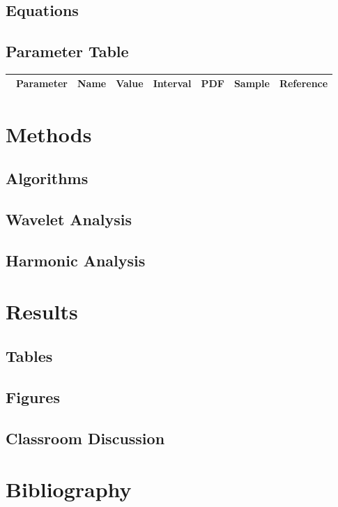 \subsection{Equations}

\subsection{Parameter Table}

\begin{table}[H]\centering
\begin{tabular}{p{1cm}p{1cm}p{1cm}p{1cm}p{1cm}p{1cm}p{4cm}}\
Parameter & Name & Value & Interval & PDF & Sample & Reference \\
\hline
\hline
\end{tabular}
\end{table}

\section{Methods}

\subsection{Algorithms}

\subsection{Wavelet Analysis}

\subsection{Harmonic Analysis}


\section{Results}

\subsection{Tables}

\subsection{Figures}

\subsection{Classroom Discussion}

\section{Bibliography}
